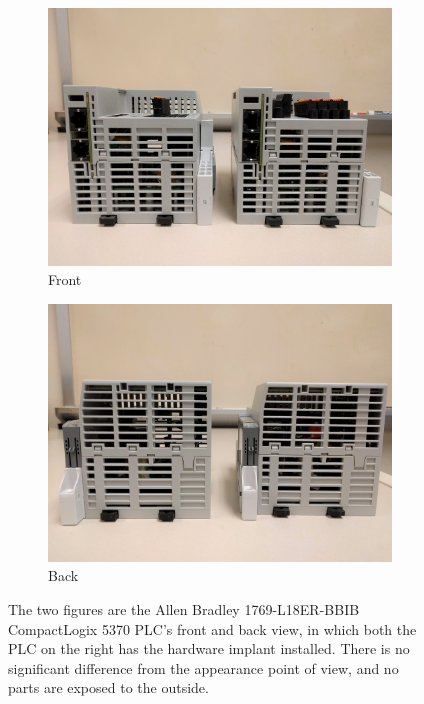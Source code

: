 \begin{figure}[tp]
	\centering
    \begin{subfigure}[b]{0.22\textwidth}
    	\centering
	\includegraphics[width=1\textwidth]{figures/eval_b2}
        \vspace{-0.15in}
        \caption{Front}
		\label{fig:eval_b1}
	\end{subfigure}
	\begin{subfigure}[b]{0.22\textwidth}
    	\centering
	\includegraphics[width=1\textwidth]{figures/eval_b1}
        \vspace{-0.15in}
	\caption{Back}
		\label{fig:eval_b2}
	\end{subfigure}
    \vspace{-0.15in}
    \caption{The two figures are the Allen Bradley 1769-L18ER-BBIB CompactLogix 5370 PLC's front and back view, in which both the PLC on the right has the hardware implant installed. There is no significant difference from the appearance point of view, and no parts are exposed to the outside.}
	\vspace{-0.15in}
\end{figure}

